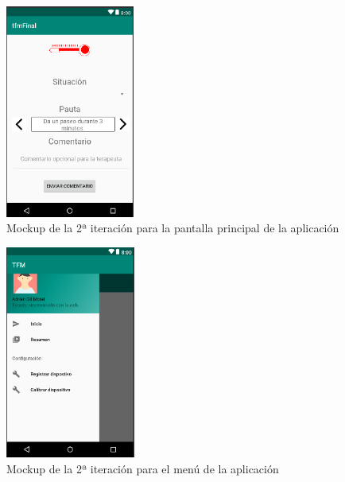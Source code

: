 \begin{figure}[H]
    \centering
    \begin{minipage}{.45\textwidth}
        \centering
        \includegraphics[width=0.8\linewidth, height=7cm]{Imagenes/04DescProblema/mockups/v2/android/01-principal.png}
        \caption[Mockup de la 2ª iteración para la pantalla principal de la aplicación]{Mockup de la 2ª iteración para la pantalla principal de la aplicación}
        \label{c4:fig:v2:android:principal}
    \end{minipage}
\end{figure}

\begin{figure}[H]
    \centering
    \begin{minipage}{.45\textwidth}
        \centering
        \includegraphics[width=0.8\linewidth, height=7cm]{Imagenes/04DescProblema/mockups/v2/android/02-menu.png}
        \caption[Mockup de la 2ª iteración para el menú de la aplicación]{Mockup de la 2ª iteración para el menú de la aplicación}
        \label{c4:fig:v2:android:menu}
    \end{minipage}
\end{figure}


